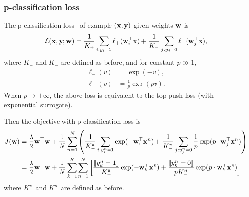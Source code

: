 \subsubsection{p-classification loss}
\label{sssec:pclass}

The p-classification loss~\cite{ertekin2011equivalence} of example $(\mathbf{x}, \mathbf{y})$ given weights $\mathbf{w}$ is
\begin{equation}
\label{eq:loss_pclass}
\mathcal{L}(\mathbf{x}, \mathbf{y}; \mathbf{w}) = \frac{1}{K_+} \sum_{i:y_i=1} \ell_+(\mathbf{w}_i^\top \mathbf{x}) + \frac{1}{K_-} \sum_{j:y_j=0} \ell_-(\mathbf{w}_j^\top \mathbf{x}),
\end{equation}
where $K_+$ and $K_-$ are defined as before, 
and for constant $p \gg 1$,
\begin{equation}
\begin{aligned}
\ell_+(v) & = \exp(-v), \\
\ell_-(v) & = \frac{1}{p} \exp(pv).
\end{aligned}
\end{equation}
When $p \to +\infty$, the above loss is equivalent to the top-push loss (with exponential surrogate).

Then the objective with p-classification loss is
\begin{align*}
J(\mathbf{w}) 
&= \frac{\lambda}{2} \mathbf{w}^\top \mathbf{w} + \frac{1}{N} \sum_{n=1}^N \left( 
   \frac{1}{K_+^n} \sum_{i:y_i^n=1} \exp(-\mathbf{w}_i^\top \mathbf{x}^n) + 
   \frac{1}{K_-^n} \sum_{j:y_j^n=0} \frac{1}{p} \exp(p \cdot \mathbf{w}_j^\top \mathbf{x}^n) \right) \\
&= \frac{\lambda}{2} \mathbf{w}^\top \mathbf{w} + \frac{1}{N} \sum_{k=1}^K \sum_{n=1}^N \left[
   \frac{\llbracket y_k^n = 1 \rrbracket}{K_+^n} \exp(-\mathbf{w}_k^\top \mathbf{x}^n) + 
   \frac{\llbracket y_k^n = 0 \rrbracket}{p K_-^n} \exp(p \cdot \mathbf{w}_k^\top \mathbf{x}^n) \right]
\end{align*}
where $K_+^n$ and $K_-^n$ are defined as before.



